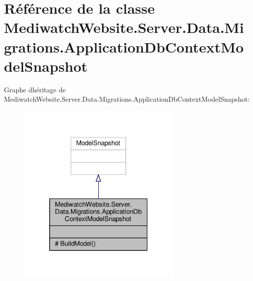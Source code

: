 \hypertarget{class_mediwatch_website_1_1_server_1_1_data_1_1_migrations_1_1_application_db_context_model_snapshot}{}\section{Référence de la classe Mediwatch\+Website.\+Server.\+Data.\+Migrations.\+Application\+Db\+Context\+Model\+Snapshot}
\label{class_mediwatch_website_1_1_server_1_1_data_1_1_migrations_1_1_application_db_context_model_snapshot}


Graphe d\textquotesingle{}héritage de Mediwatch\+Website.\+Server.\+Data.\+Migrations.\+Application\+Db\+Context\+Model\+Snapshot\+:\nopagebreak
\begin{figure}[H]
\begin{center}
\leavevmode
\includegraphics[width=229pt]{class_mediwatch_website_1_1_server_1_1_data_1_1_migrations_1_1_application_db_context_model_snapshot__inherit__graph}
\end{center}
\end{figure}



